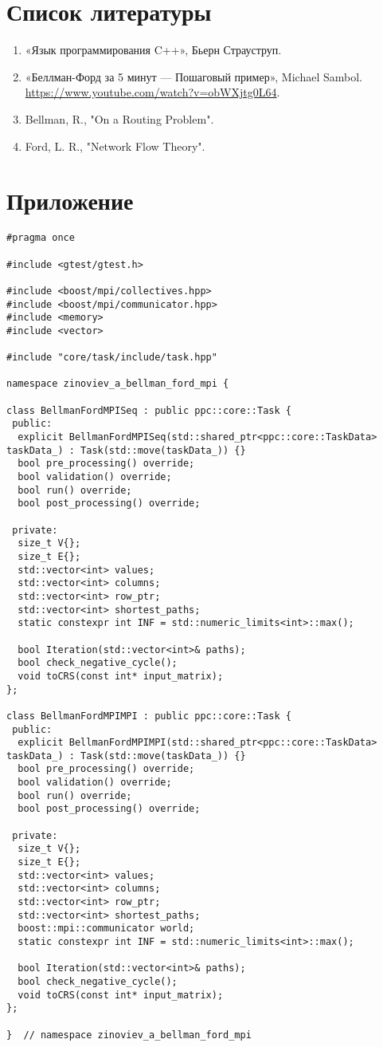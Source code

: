 \documentclass[12pt]{article}
\begin{document}
\newpage
\section*{Список литературы}

\begin{enumerate}
    \item «Язык программирования C++», Бьерн Страуструп.
    \item «Беллман-Форд за 5 минут — Пошаговый пример», Michael Sambol.
    \url {https://www.youtube.com/watch?v=obWXjtg0L64}.
    \item Bellman, R., "On a Routing Problem".
    \item Ford, L. R., "Network Flow Theory".
\end{enumerate}

\newpage
\section*{Приложение}

\begin{lstlisting}[caption={ops\_mpi\_.hpp}]
#pragma once

#include <gtest/gtest.h>

#include <boost/mpi/collectives.hpp>
#include <boost/mpi/communicator.hpp>
#include <memory>
#include <vector>

#include "core/task/include/task.hpp"

namespace zinoviev_a_bellman_ford_mpi {

class BellmanFordMPISeq : public ppc::core::Task {
 public:
  explicit BellmanFordMPISeq(std::shared_ptr<ppc::core::TaskData> taskData_) : Task(std::move(taskData_)) {}
  bool pre_processing() override;
  bool validation() override;
  bool run() override;
  bool post_processing() override;

 private:
  size_t V{};
  size_t E{};
  std::vector<int> values;
  std::vector<int> columns;
  std::vector<int> row_ptr;
  std::vector<int> shortest_paths;
  static constexpr int INF = std::numeric_limits<int>::max();

  bool Iteration(std::vector<int>& paths);
  bool check_negative_cycle();
  void toCRS(const int* input_matrix);
};

class BellmanFordMPIMPI : public ppc::core::Task {
 public:
  explicit BellmanFordMPIMPI(std::shared_ptr<ppc::core::TaskData> taskData_) : Task(std::move(taskData_)) {}
  bool pre_processing() override;
  bool validation() override;
  bool run() override;
  bool post_processing() override;

 private:
  size_t V{};
  size_t E{};
  std::vector<int> values;
  std::vector<int> columns;
  std::vector<int> row_ptr;
  std::vector<int> shortest_paths;
  boost::mpi::communicator world;
  static constexpr int INF = std::numeric_limits<int>::max();

  bool Iteration(std::vector<int>& paths);
  bool check_negative_cycle();
  void toCRS(const int* input_matrix);
};

}  // namespace zinoviev_a_bellman_ford_mpi
\end{lstlisting}
\end{document}
